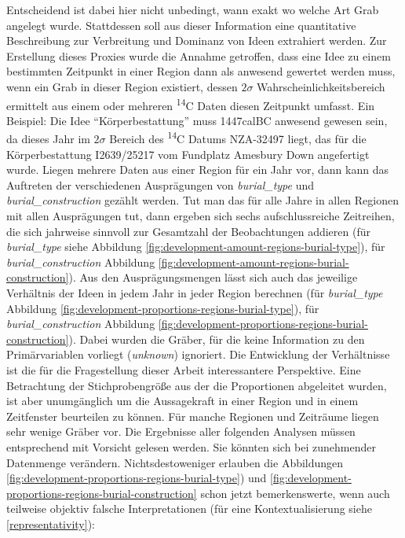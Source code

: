 \documentclass[openany,twoside,twocolumn]{book}
\begin{document}
Entscheidend ist dabei hier nicht unbedingt, wann exakt wo welche Art
Grab angelegt wurde. Stattdessen soll aus dieser Information eine
quantitative Beschreibung zur Verbreitung und Dominanz von Ideen
extrahiert werden. Zur Erstellung dieses Proxies wurde die Annahme
getroffen, dass eine Idee zu einem bestimmten Zeitpunkt in einer Region
dann als anwesend gewertet werden muss, wenn ein Grab in dieser Region
existiert, dessen \(2\sigma\) Wahrscheinlichkeitsbereich ermittelt aus
einem oder mehreren \textsuperscript{14}C Daten diesen Zeitpunkt
umfasst. Ein Beispiel: Die Idee ``Körperbestattung'' muss 1447calBC
anwesend gewesen sein, da dieses Jahr im \(2\sigma\) Bereich des
\textsuperscript{14}C Datums NZA-32497 liegt, das für die
Körperbestattung I2639/25217 vom Fundplatz Amesbury Down angefertigt
wurde. Liegen mehrere Daten aus einer Region für ein Jahr vor, dann kann
das Auftreten der verschiedenen Ausprägungen von \emph{burial\_type} und
\emph{burial\_construction} gezählt werden. Tut man das für alle Jahre
in allen Regionen mit allen Ausprägungen tut, dann ergeben sich sechs
aufschlussreiche Zeitreihen, die sich jahrweise sinnvoll zur Gesamtzahl
der Beobachtungen addieren (für \emph{burial\_type} siehe Abbildung
\ref{fig:development-amount-regions-burial-type}), für
\emph{burial\_construction} Abbildung
\ref{fig:development-amount-regions-burial-construction}). Aus den
Ausprägungsmengen lässt sich auch das jeweilige Verhältnis der Ideen in
jedem Jahr in jeder Region berechnen (für \emph{burial\_type} Abbildung
\ref{fig:development-proportions-regions-burial-type}), für
\emph{burial\_construction} Abbildung
\ref{fig:development-proportions-regions-burial-construction}). Dabei
wurden die Gräber, für die keine Information zu den Primärvariablen
vorliegt (\emph{unknown}) ignoriert. Die Entwicklung der Verhältnisse
ist die für die Fragestellung dieser Arbeit interessantere Perspektive.
Eine Betrachtung der Stichprobengröße aus der die Proportionen
abgeleitet wurden, ist aber unumgänglich um die Aussagekraft in einer
Region und in einem Zeitfenster beurteilen zu können. Für manche
Regionen und Zeiträume liegen sehr wenige Gräber vor. Die Ergebnisse
aller folgenden Analysen müssen entsprechend mit Vorsicht gelesen
werden. Sie könnten sich bei zunehmender Datenmenge verändern.
Nichtsdestoweniger erlauben die Abbildungen
\ref{fig:development-proportions-regions-burial-type}) und
\ref{fig:development-proportions-regions-burial-construction} schon
jetzt bemerkenswerte, wenn auch teilweise objektiv falsche
Interpretationen (für eine Kontextualisierung siehe
\ref{representativity}):
\end{document}
